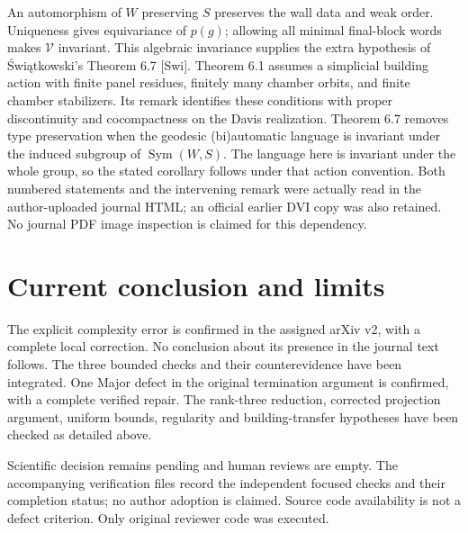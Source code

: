 \documentclass[10pt]{article}
\begin{document}
An automorphism of \(W\) preserving \(S\) preserves the wall data and weak order. Uniqueness gives equivariance of \(p(g)\); allowing all minimal final-block words makes \(\mathcal V\) invariant. This algebraic invariance supplies the extra hypothesis of Świątkowski’s Theorem 6.7 [Swi]. Theorem 6.1 assumes a simplicial building action with finite panel residues, finitely many chamber orbits, and finite chamber stabilizers. Its remark identifies these conditions with proper discontinuity and cocompactness on the Davis realization. Theorem 6.7 removes type preservation when the geodesic (bi)automatic language is invariant under the induced subgroup of \(\operatorname{Sym}(W,S)\). The language here is invariant under the whole group, so the stated corollary follows under that action convention. Both numbered statements and the intervening remark were actually read in the author-uploaded journal HTML; an official earlier DVI copy was also retained. No journal PDF image inspection is claimed for this dependency.\par
\section*{Current conclusion and limits}
The explicit complexity error is confirmed in the assigned arXiv v2, with a complete local correction. No conclusion about its presence in the journal text follows. The three bounded checks and their counterevidence have been integrated. One Major defect in the original termination argument is confirmed, with a complete verified repair. The rank-three reduction, corrected projection argument, uniform bounds, regularity and building-transfer hypotheses have been checked as detailed above.\par
Scientific decision remains pending and human reviews are empty. The accompanying verification files record the independent focused checks and their completion status; no author adoption is claimed. Source code availability is not a defect criterion. Only original reviewer code was executed.\par
\end{document}
